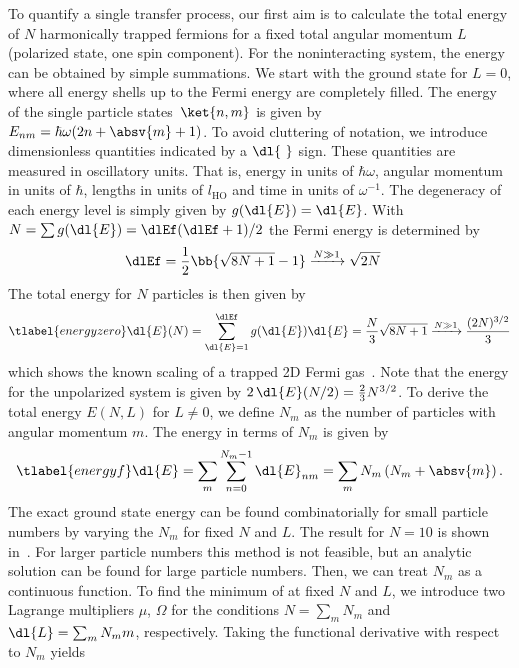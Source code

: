 
To quantify a single transfer process, our first aim is to calculate the total energy of $N$ harmonically trapped fermions for a fixed total angular momentum $L$ (polarized state, one spin component). For the noninteracting system, the energy can be obtained by simple summations. We start with the ground state for $L=0$, where all energy shells up to the Fermi energy are completely filled. The energy of the single particle states~$\ket{n,m}$ is given by $E_{nm}=\hbar\omega(2n+\absv{m}+1)$. To avoid cluttering of notation, we introduce dimensionless quantities indicated by a $\dl{\ }$ sign. These quantities are measured in oscillatory units. That is, energy in units of $\hbar\omega$, angular momentum in units of $\hbar$, lengths in units of $l_\text{HO}$ and time in units of $\omega^{-1}$. The degeneracy of each energy level is simply given by $g(\dl{E}) = \dl{E}$.
With $N=\sum g(\dl{E}) = \dlEf(\dlEf+1)/2$ the Fermi energy is determined by
\begin{align}
\dlEf &= \frac{1}{2}\bb{\sqrt{8N+1}-1} \xrightarrow{N\gg 1} \sqrt{2N}
\end{align}
The total energy for $N$ particles is then given by
\begin{align} \tlabel{energyzero}
\dl{E}(N) = \sum_{\dl{E}=1}^{\dlEf} g(\dl{E}) \dl{E} = \frac{N}{3} \sqrt{8N+1} \xrightarrow{N\gg 1} \frac{(2N)^{3/2}}{3}
\end{align}
which shows the known scaling of a trapped 2D Fermi gas~\cite{Yoshimoto2003}.
Note that the energy for the unpolarized system is given by $2\,\dl{E}(N/2)=\frac{2}{3} N^{3/2}$.
To derive the total energy $E(N,L)$ for $L\ne 0$, we define $N_m$ as the number of particles with angular momentum $m$. The energy in terms of $N_m$ is given by
\begin{align} \tlabel{energyf}
\dl{E} = \sum_m \sum_{n=0}^{N_m-1} \dl{E}_{nm} = \sum_m N_m\left(N_m + \absv{m} \right).
\end{align}
The exact ground state energy can be found combinatorially for small particle numbers by varying the $N_m$ for fixed $N$ and $L$. The result for $N=10$ is shown in~. For larger particle numbers this method is not feasible, but an analytic solution can be found for large particle numbers. Then, we can treat $N_{m}$ as a continuous function. To find the minimum of  at fixed $N$ and $L$, we introduce two Lagrange multipliers $\mu$, $\Omega$ for the conditions $N = \sum_m N_m$ and $\dl{L} = \sum_m N_m m$, respectively. Taking the functional derivative with respect to $N_m$ yields
